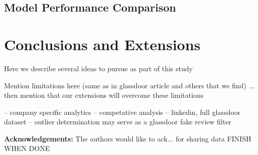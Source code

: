 \documentclass[10pt]{article}
\begin{document}
\subsection{Model Performance Comparison}

\section{Conclusions and Extensions}


Here we describe several ideas to pursue as part of this study

Mention limitations here (same as in glassdoor article and others that we find) ... then 
mention that our extensions will overcome these limitations 

-- company specific analytics
-- competative analysis
-- linkedin, full glassdoor dataset 
-- outlier determination may serve as a glassdoor fake review filter 



\textbf{Acknowledgements:} The authors would like to ack... for sharing data FINISH WHEN DONE




\end{document}
